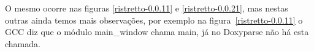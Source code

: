 O mesmo ocorre nas figuras \ref{ristretto-0.0.11} e \ref{ristretto-0.0.21}, mas nestas outras ainda temos mais observações, por exemplo na figura~\ref{ristretto-0.0.11} o GCC diz que o módulo main\_window chama main, já no Doxyparse não há esta chamada.

\begin{figure}
\center
{}
\qquad
{}

\end{figure}
